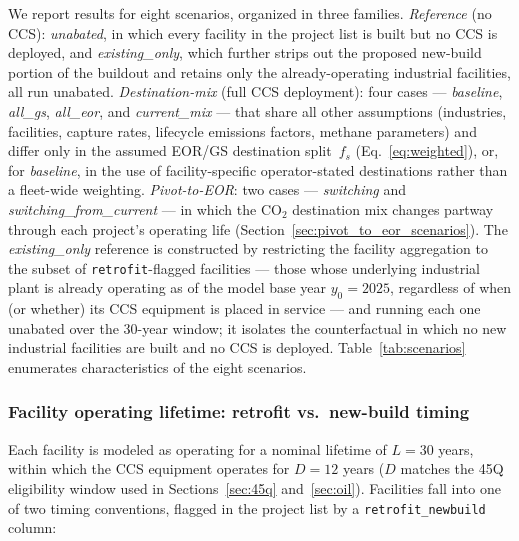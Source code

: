\documentclass[11pt]{article}
\newcommand{\cotwo}{\ensuremath{\mathrm{CO_2}}}
\begin{document}
We report results for eight scenarios, organized in three families.
\emph{Reference} (no CCS): \emph{unabated}, in which every facility in the project list is built but no CCS is deployed, and \emph{existing\_only}, which further strips out the proposed new-build portion of the buildout and retains only the already-operating industrial facilities, all run unabated.
\emph{Destination-mix} (full CCS deployment): four cases --- \emph{baseline}, \emph{all\_gs}, \emph{all\_eor}, and \emph{current\_mix} --- that share all other assumptions (industries, facilities, capture rates, lifecycle emissions factors, methane parameters) and differ only in the assumed EOR/GS destination split~$f_s$ (Eq.~\eqref{eq:weighted}), or, for \emph{baseline}, in the use of facility-specific operator-stated destinations rather than a fleet-wide weighting.
\emph{Pivot-to-EOR}: two cases --- \emph{switching} and \emph{switching\_from\_current} --- in which the \cotwo{} destination mix changes partway through each project's operating life (Section~\ref{sec:pivot_to_eor_scenarios}).
The \emph{existing\_only} reference is constructed by restricting the facility aggregation to the subset of \texttt{retrofit}-flagged facilities --- those whose underlying industrial plant is already operating as of the model base year $y_0 = 2025$, regardless of when (or whether) its CCS equipment is placed in service --- and running each one unabated over the 30-year window; it isolates the counterfactual in which no new industrial facilities are built and no CCS is deployed. Table~\ref{tab:scenarios} enumerates characteristics of the eight scenarios.

\subsubsection{Facility operating lifetime: retrofit vs.\ new-build timing}
\label{sec:facility_timing}

Each facility is modeled as operating for a nominal lifetime of $L = 30$ years, within which the CCS equipment operates for $D = 12$ years ($D$ matches the 45Q eligibility window used in Sections~\ref{sec:45q} and~\ref{sec:oil}). Facilities fall into one of two timing conventions, flagged in the project list by a \texttt{retrofit\_newbuild} column:
\end{document}
